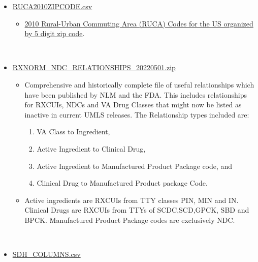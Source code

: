 \documentclass[
]{journal}
\providecommand{\tightlist}{%
  \setlength{\itemsep}{0pt}\setlength{\parskip}{0pt}}
\begin{document}
\begin{itemize}
\tightlist
\item
  \href{https://github.com/UNMC-CRANE/AMIA_Workshop_May_2022/blob/main/Handouts_for_workshop/RUCA2010ZIPCODE.csv}{RUCA2010ZIPCODE.csv}

  \begin{itemize}
  \tightlist
  \item
    \href{https://ers.usda.gov/data-products/rural-urban-commuting-area-codes/}{2010 Rural-Urban Commuting Area (RUCA) Codes for the US organized by 5 digit zip code}.\\
    \strut \\
  \end{itemize}
\item
  \href{https://github.com/UNMC-CRANE/AMIA_Workshop_May_2022/blob/main/Handouts_for_workshop/RXNORM_NDC_RELATIONSHIPS_20220501.zip}{RXNORM\_NDC\_RELATIONSHIPS\_20220501.zip}

  \begin{itemize}
  \tightlist
  \item
    Comprehensive and historically complete file of useful relationships which have been published by NLM and the FDA. This includes relationships for RXCUIs, NDCs and VA Drug Classes that might now be listed as inactive in current UMLS releases. The Relationship types included are:

    \begin{enumerate}
    \def\labelenumi{\arabic{enumi})}
    \tightlist
    \item
      VA Class to Ingredient,
    \item
      Active Ingredient to Clinical Drug,
    \item
      Active Ingredient to Manufactured Product Package code, and
    \item
      Clinical Drug to Manufactured Product package Code.
    \end{enumerate}
  \item
    Active ingredients are RXCUIs from TTY classes PIN, MIN and IN. Clinical Drugs are RXCUIs from TTYs of SCDC,SCD,GPCK, SBD and BPCK. Manufactured Product Package codes are exclusively NDC.\\
    \strut \\
  \end{itemize}
\item
  \href{https://github.com/UNMC-CRANE/AMIA_Workshop_May_2022/blob/main/Handouts_for_workshop/SDH_Columns.csv}{SDH\_COLUMNS.csv}


\end{itemize}
\end{document}
